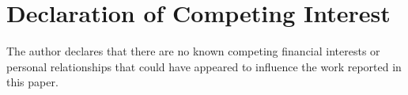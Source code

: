\documentclass[12pt]{article}
\begin{document}
\section*{Declaration of Competing Interest}

The author declares that there are no known competing financial interests or personal relationships that could have appeared to influence the work reported in this paper.
\end{document}
